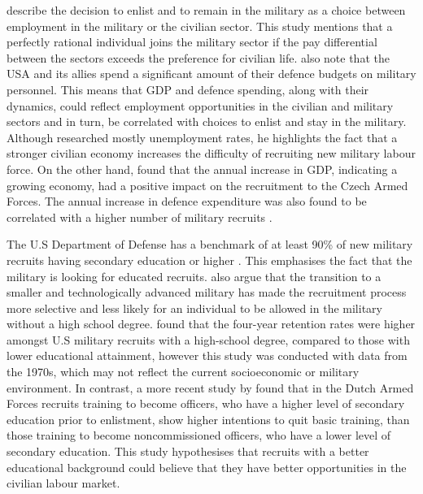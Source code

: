 \textcite{warner_chapter_1995} describe the decision to enlist and to remain in the military
as a choice between employment in the military or the civilian sector. This study 
mentions that a perfectly rational individual joins the military sector if the pay
differential between the sectors exceeds the preference for civilian life. \textcite{warner_chapter_1995} 
also note that the USA and its allies spend a significant amount of 
their defence budgets on military personnel. This means that GDP and defence spending, 
along with their dynamics, could reflect employment opportunities in the civilian and 
military sectors and in turn, be correlated with choices to enlist and stay in the military.
Although \textcite{backstrom_are_2019} researched mostly unemployment rates, he highlights 
the fact that a stronger civilian economy increases the difficulty of recruiting new military 
labour force. On the other hand, \textcite{holcner_military_2021} found that the annual 
increase in GDP, indicating a growing economy, had a positive impact on the recruitment to the 
Czech Armed Forces. The annual increase in defence expenditure was also found to be 
correlated with a higher number of military recruits \parencite{holcner_military_2021}.

The U.S Department of Defense has a benchmark of at least 90\% of new military recruits 
having secondary education or higher \parencite{cnas_resources_and_force_readiness_division_fiscal_nodate}.
This emphasises the fact that the military is looking for educated recruits. \textcite{asoni_rich_2013} 
also argue that the transition to a smaller and technologically advanced military has 
made the recruitment process more selective and less likely for an individual to 
be allowed in the military without a high school degree. \textcite{elster_study_1982} 
found that the four-year retention rates were higher amongst U.S military recruits 
with a high-school degree, compared to those with lower educational attainment, however 
this study was conducted with data from the 1970s, which may not reflect the current 
socioeconomic or military environment. 
In contrast, a more recent study by \textcite{hof_quality_2023} found that in the 
Dutch Armed Forces recruits training to become officers, who have a higher level of 
secondary education prior to enlistment, show higher intentions to quit basic training, 
than those training to become noncommissioned officers, who have a lower level of 
secondary education. This study hypothesises that recruits with a better educational 
background could believe that they have better opportunities in the civilian labour market.

